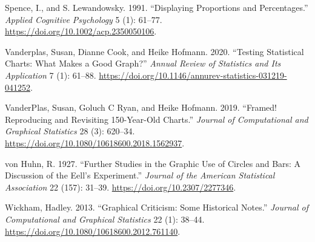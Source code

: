 \documentclass[
  10pt,
  letterpaper,
  twocolumn]{article}
\newlength{\cslhangindent}
\newenvironment{CSLReferences}[2] %
 {\begin{list}{}{%
  \setlength{\itemindent}{0pt}
  \setlength{\leftmargin}{0pt}
  \setlength{\parsep}{0pt}
  \ifodd #1
   \setlength{\leftmargin}{\cslhangindent}
   \setlength{\itemindent}{-1\cslhangindent}
  \fi
  \setlength{\itemsep}{#2\baselineskip}}}
 {\end{list}}
\begin{document}
\begin{CSLReferences}{1}{0}
Spence, I., and S. Lewandowsky. 1991. {``Displaying Proportions and
Percentages.''} \emph{Applied Cognitive Psychology} 5 (1): 61--77.
\url{https://doi.org/10.1002/acp.2350050106}.

Vanderplas, Susan, Dianne Cook, and Heike Hofmann. 2020. {``Testing
{Statistical Charts}: {What Makes} a {Good Graph}?''} \emph{Annual
Review of Statistics and Its Application} 7 (1): 61--88.
\url{https://doi.org/10.1146/annurev-statistics-031219-041252}.

VanderPlas, Susan, Goluch C Ryan, and Heike Hofmann. 2019. {``Framed!
{Reproducing} and {Revisiting} 150-{Year-Old Charts}.''} \emph{Journal
of Computational and Graphical Statistics} 28 (3): 620--34.
\url{https://doi.org/10.1080/10618600.2018.1562937}.

von Huhn, R. 1927. {``Further Studies in the Graphic Use of Circles and
Bars: A Discussion of the Eell's Experiment.''} \emph{Journal of the
American Statistical Association} 22 (157): 31--39.
\url{https://doi.org/10.2307/2277346}.

Wickham, Hadley. 2013. {``Graphical {Criticism}: {Some Historical
Notes}.''} \emph{Journal of Computational and Graphical Statistics} 22
(1): 38--44. \url{https://doi.org/10.1080/10618600.2012.761140}.

\end{CSLReferences}


\end{document}
